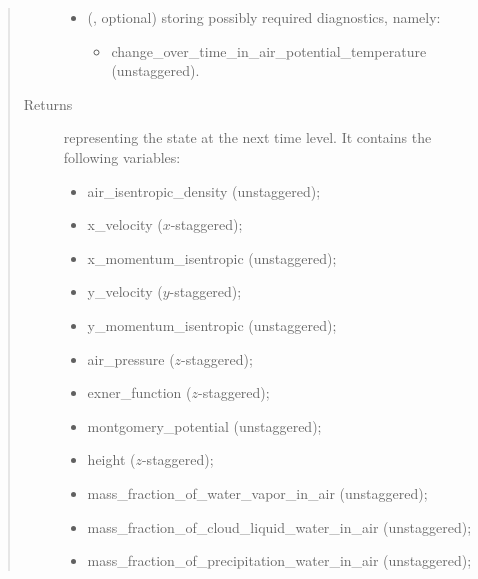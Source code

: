 \documentclass[letterpaper,10pt,english]{sphinxmanual}
\begin{document}
\begin{fulllineitems}
\begin{fulllineitems}
\begin{quote}
\begin{description}
\begin{itemize}
\item {} 
 (, optional) \textendash{} 
{\hyperref[\detokenize{api:storages.grid_data.GridData}]{}} storing possibly required diagnostics, namely:
\begin{itemize}
\item {} 
change\_over\_time\_in\_air\_potential\_temperature (unstaggered).

\end{itemize}


\end{itemize}

\item[{Returns}] \leavevmode

{\hyperref[\detokenize{api:storages.state_isentropic.StateIsentropic}]{}} representing the state at the next time level.
It contains the following variables:
\begin{itemize}
\item {} 
air\_isentropic\_density (unstaggered);

\item {} 
x\_velocity (\(x\)-staggered);

\item {} 
x\_momentum\_isentropic (unstaggered);

\item {} 
y\_velocity (\(y\)-staggered);

\item {} 
y\_momentum\_isentropic (unstaggered);

\item {} 
air\_pressure (\(z\)-staggered);

\item {} 
exner\_function (\(z\)-staggered);

\item {} 
montgomery\_potential (unstaggered);

\item {} 
height (\(z\)-staggered);

\item {} 
mass\_fraction\_of\_water\_vapor\_in\_air (unstaggered);

\item {} 
mass\_fraction\_of\_cloud\_liquid\_water\_in\_air (unstaggered);

\item {} 
mass\_fraction\_of\_precipitation\_water\_in\_air (unstaggered);


\end{itemize}
\end{description}
\end{quote}
\end{fulllineitems}
\end{fulllineitems}
\end{document}
